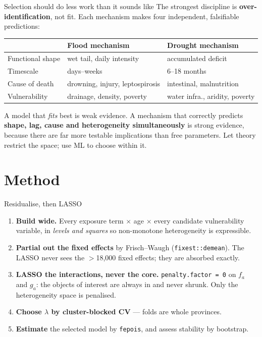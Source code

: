 \documentclass[10pt, aspectratio=169]{beamer}
\begin{document}
\begin{frame}{Selection should do less work than it sounds like}
  The strongest discipline is \textbf{over-identification}, not fit. Each
  mechanism makes four independent, falsifiable predictions:
  \begin{center}
    \small
    \begin{tabular}{lll}
      \toprule
       & Flood mechanism & Drought mechanism \\
      \midrule
      Functional shape & wet tail, daily intensity & accumulated deficit \\
      Timescale        & days--weeks               & 6--18 months \\
      Cause of death   & drowning, injury, leptospirosis & intestinal, malnutrition \\
      Vulnerability    & drainage, density, poverty & water infra., aridity, poverty \\
      \bottomrule
    \end{tabular}
  \end{center}
  \vspace{0.5em}
  A model that \emph{fits} best is weak evidence. A mechanism that correctly
  predicts \textbf{shape, lag, cause and heterogeneity simultaneously} is
  strong evidence, because there are far more testable implications than free
  parameters. Let theory restrict the space; use ML to choose within it.
\end{frame}

\section{Method}

\begin{frame}{Residualise, then LASSO}
  \begin{enumerate}
    \item \textbf{Build wide.} Every exposure term $\times$ age $\times$ every
          candidate vulnerability variable, in \emph{levels and squares} so
          non-monotone heterogeneity is expressible.
    \item \textbf{Partial out the fixed effects} by Frisch--Waugh
          (\texttt{fixest::demean}). The LASSO never sees the $>$18,000 fixed
          effects; they are absorbed exactly.
    \item \textbf{LASSO the interactions, never the core.}
          \texttt{penalty.factor = 0} on $f_a$ and $g_a$: the objects of
          interest are always in and never shrunk. Only the heterogeneity
          space is penalised.
    \item \textbf{Choose $\lambda$ by cluster-blocked CV} --- folds are whole
          provinces.
    \item \textbf{Estimate} the selected model by \texttt{fepois}, and assess
          stability by bootstrap.
  \end{enumerate}
\end{frame}
\end{document}
